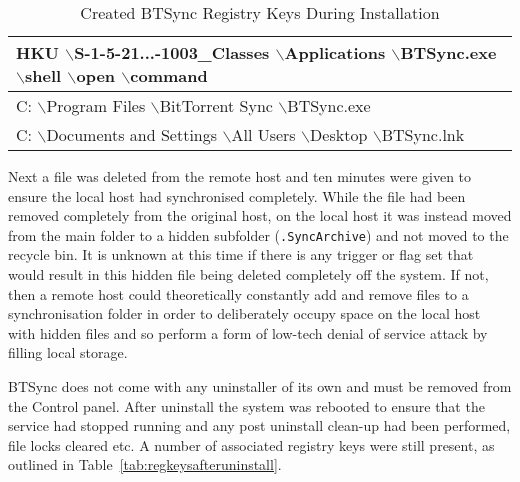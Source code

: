 \documentclass[final,5p,times,twocolumn]{elsarticle}
\begin{document}
\begin{table}[h]
\begin{tabular}{|>{\raggedright\arraybackslash}p{8.5cm}|}
    HKU $\backslash$S-1-5-21...-1003\_Classes $\backslash$Applications $\backslash$BTSync.exe $\backslash$shell $\backslash$open $\backslash$command \\ \hline
    C: $\backslash$Program Files $\backslash$BitTorrent Sync $\backslash$BTSync.exe                                                              \\ \hline
    C: $\backslash$Documents and Settings $\backslash$All Users $\backslash$Desktop $\backslash$BTSync.lnk                                          \\ \hline
    \end{tabular}
    \caption {Created BTSync Registry Keys During Installation}
\label{tab:regkeys}
\end{table}

Next a file was deleted from the remote host and ten minutes were given to ensure the local host had synchronised completely. While the file had been removed completely from the original host, on the local host it was instead moved from the main folder to a hidden subfolder (\texttt{.SyncArchive}) and not moved to the recycle bin. It is unknown at this time if there is any trigger or flag set that would result in this hidden file being deleted completely off the system. If not, then a remote host could theoretically constantly add and remove files to a synchronisation folder in order to deliberately occupy space on the local host with hidden files and so perform a form of low-tech denial of service attack by filling local storage.

BTSync does not come with any uninstaller of its own and must be removed from the Control panel. After uninstall the system was rebooted to ensure that the service had stopped running and any post uninstall clean-up had been performed, file locks cleared etc. A number of associated registry keys were still present, as outlined in Table~\ref{tab:regkeysafteruninstall}.
\end{document}
